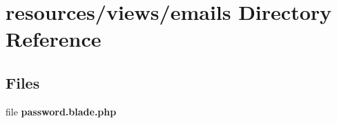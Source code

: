 \section{resources/views/emails Directory Reference}
\label{dir_dbed98ecc2d2bc620aee46b362adfa4d}
\subsection*{Files}
\begin{DoxyCompactItemize}
\item 
file {\bf password.\+blade.\+php}
\end{DoxyCompactItemize}
